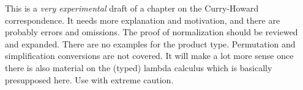\documentclass[../../../include/open-logic-chapter]{subfiles}
\begin{document}

\begin{editorial}
  This is a \emph{very experimental} draft of a chapter on the
  Curry-Howard correspondence.  It needs more explanation and
  motivation, and there are probably errors and omissions. The proof
  of normalization should be reviewed and expanded. There are no
  examples for the product type. Permutation and simplification
  conversions are not covered. It will make a lot more sense once
  there is also material on the (typed) lambda calculus which is
  basically presupposed here. Use with extreme caution.
\end{editorial}


\OLEndChapterHook
\end{document}
